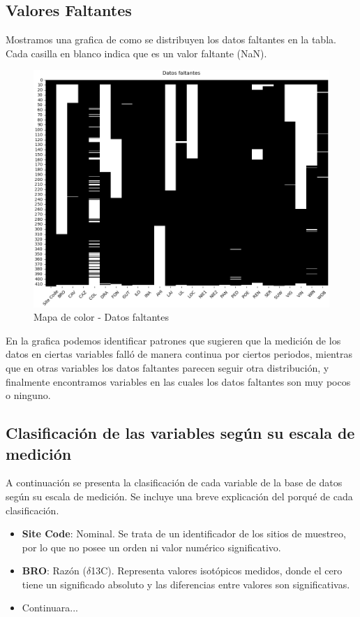 \documentclass[a4paper,11pt]{article}
\begin{document}
\subsection*{Valores Faltantes}

Mostramos una grafica de como se distribuyen los datos faltantes en la tabla. Cada casilla en blanco indica que es un valor faltante (NaN).

\begin{figure}[ht]
	\centering
	\includegraphics[width=0.7\linewidth]{figures/faltantes}
	\caption{Mapa de color - Datos faltantes}
	\label{fig:faltantes}
\end{figure}

En la grafica podemos identificar patrones que sugieren que la medición de los datos en ciertas variables falló de manera continua por ciertos periodos, mientras que en otras variables los datos faltantes parecen seguir otra distribución, y finalmente encontramos variables en las cuales los datos faltantes son muy pocos o ninguno.


\subsection*{Clasificación de las variables según su escala de medición}

A continuación se presenta la clasificación de cada variable de la base de datos según su escala de medición. Se incluye una breve explicación del porqué de cada clasificación.

\begin{itemize}
    \item \textbf{Site Code}: Nominal.
    Se trata de un identificador de los sitios de muestreo, por lo que no posee un orden ni valor numérico significativo.

    \item \textbf{BRO}: Razón ($\delta$13C).
    Representa valores isotópicos medidos, donde el cero tiene un significado absoluto y las diferencias entre valores son significativas.

    \item Continuara...

\end{itemize}
\end{document}
